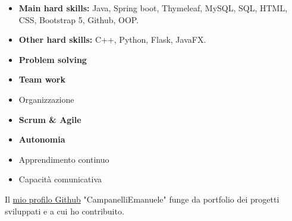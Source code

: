 \documentclass[10pt,a4paper,ragged2e,withhyper]{other/altacv}
\begin{document}
\begin{paracol}{2}

\begin{itemize}
    \item \textbf{Main hard skills:} Java, Spring boot, Thymeleaf, MySQL, SQL, HTML, CSS, Bootstrap 5, Github, OOP. 
    \item \textbf{Other hard skills:} C++, Python, Flask, JavaFX. 
\end{itemize}

\begin{itemize}
    \item \textbf{Problem solving}
    \item \textbf{Team work}
    \item Organizzazione
    \item \textbf{Scrum \& Agile}
    \item \textbf{Autonomia}
    \item Apprendimento continuo
    \item Capacità comunicativa
\end{itemize}
\medskip


\vspace{2.5pt}
\medskip

Il \href{https://github.com/CampanelliEmanuele}{mio profilo Github} "CampanelliEmanuele" funge da portfolio dei progetti sviluppati e a cui ho contribuito.
\medskip

\end{paracol}
\end{document}
